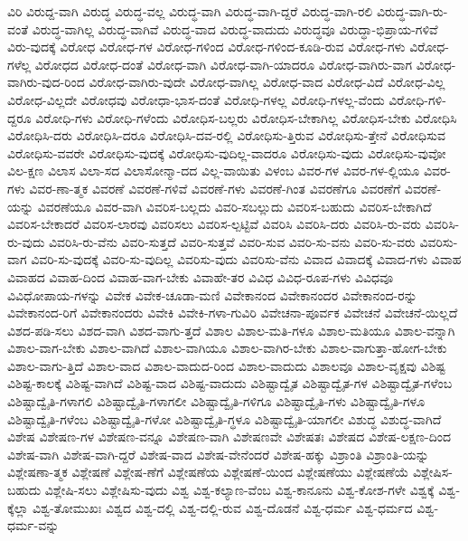 {ವಿರಿ
ವಿರುದ್ದ-ವಾಗಿ
ವಿರುದ್ಧ
ವಿರುದ್ಧ-ವಲ್ಲ
ವಿರುದ್ಧ-ವಾಗಿ
ವಿರುದ್ಧ-ವಾಗಿ-ದ್ದರೆ
ವಿರುದ್ಧ-ವಾಗಿ-ರಲಿ
ವಿರುದ್ಧ-ವಾಗಿ-ರು-ವಂತೆ
ವಿರುದ್ಧ-ವಾಗಿಲ್ಲ
ವಿರುದ್ಧ-ವಾಗಿವೆ
ವಿರುದ್ಧ-ವಾದ
ವಿರುದ್ಧ-ವಾದುದು
ವಿರುದ್ಧವೂ
ವಿರುದ್ಧಾ-ಭಿಪ್ರಾಯ-ಗಳಿವೆ
ವಿರು-ವುದಕ್ಕೆ
ವಿರೋಧ
ವಿರೋಧ-ಗಳ
ವಿರೋಧ-ಗಳಿಂದ
ವಿರೋಧ-ಗಳಿಂದ-ಕೂಡಿ-ರುವ
ವಿರೋಧ-ಗಳು
ವಿರೋಧ-ಗಳೆಲ್ಲ
ವಿರೋಧದ
ವಿರೋಧ-ದಂತೆ
ವಿರೋಧ-ವಾಗಿ
ವಿರೋಧ-ವಾಗಿ-ಯಾದರೂ
ವಿರೋಧ-ವಾಗಿರು-ವಾಗ
ವಿರೋಧ-ವಾಗಿರು-ವುದ-ರಿಂದ
ವಿರೋಧ-ವಾಗಿರು-ವುದೇ
ವಿರೋಧ-ವಾಗಿಲ್ಲ
ವಿರೋಧ-ವಾದ
ವಿರೋಧ-ವಿದೆ
ವಿರೋಧ-ವಿಲ್ಲ
ವಿರೋಧ-ವಿಲ್ಲದೇ
ವಿರೋಧವು
ವಿರೋಧಾ-ಭಾಸ-ದಂತೆ
ವಿರೋಧಿ-ಗಳಲ್ಲ
ವಿರೋಧಿ-ಗಳಲ್ಲ-ವೆಂದು
ವಿರೋಧಿ-ಗಳಿ-ದ್ದರೂ
ವಿರೋಧಿ-ಗಳು
ವಿರೋಧಿ-ಗಳೆಂದು
ವಿರೋಧಿಸ-ಬಲ್ಲರು
ವಿರೋಧಿಸ-ಬೇಕಾಗಿಲ್ಲ
ವಿರೋಧಿಸ-ಬೇಕು
ವಿರೋಧಿಸಿ
ವಿರೋಧಿಸಿ-ದರು
ವಿರೋಧಿಸಿ-ದರೂ
ವಿರೋಧಿಸಿ-ದವ-ರಲ್ಲಿ
ವಿರೋಧಿಸು-ತ್ತಿರುವ
ವಿರೋಧಿಸು-ತ್ತೇನೆ
ವಿರೋಧಿಸುವ
ವಿರೋಧಿಸು-ವವರೇ
ವಿರೋಧಿಸು-ವುದಕ್ಕೆ
ವಿರೋಧಿಸು-ವುದಿಲ್ಲ-ವಾದರೂ
ವಿರೋಧಿಸು-ವುದು
ವಿರೋಧಿಸು-ವುವೋ
ವಿಲ-ಕ್ಷಣ
ವಿಲಾಸ
ವಿಲಾ-ಸದ
ವಿಲಾಸೋನ್ಮಾ-ದದ
ವಿಲ್ಲ-ವಾಯಿತು
ವಿಳಂಬ
ವಿವರ-ಗಳ
ವಿವರ-ಗಳ-ಲ್ಲಿಯೂ
ವಿವರ-ಗಳು
ವಿವರ-ಣಾ-ತ್ಮಕ
ವಿವರಣೆ
ವಿವರಣೆ-ಗಳಿವೆ
ವಿವರಣೆ-ಗಳು
ವಿವರಣೆ-ಗಿಂತ
ವಿವರಣೆಗೂ
ವಿವರಣೆಗೆ
ವಿವರಣೆ-ಯನ್ನು
ವಿವರಣೆಯೂ
ವಿವರ-ವಾಗಿ
ವಿವರಿಸ-ಬಲ್ಲದು
ವಿವರಿ-ಸಬಲ್ಲುದು
ವಿವರಿಸ-ಬಹುದು
ವಿವರಿಸ-ಬೇಕಾಗಿದೆ
ವಿವರಿಸ-ಬೇಕಾದರೆ
ವಿವರಿಸ-ಲಾರವು
ವಿವರಿಸಲು
ವಿವರಿಸ-ಲ್ಪಟ್ಟಿವೆ
ವಿವರಿಸಿ
ವಿವರಿಸಿ-ದರು
ವಿವರಿಸಿ-ರು-ವರು
ವಿವರಿಸಿ-ರು-ವುದು
ವಿವರಿಸಿ-ರು-ವೆನು
ವಿವರಿ-ಸುತ್ತದೆ
ವಿವರಿ-ಸುತ್ತವೆ
ವಿವರಿ-ಸುವ
ವಿವರಿ-ಸು-ವನು
ವಿವರಿ-ಸು-ವರು
ವಿವರಿಸು-ವಾಗ
ವಿವರಿ-ಸು-ವುದಕ್ಕೆ
ವಿವರಿ-ಸು-ವುದಿಲ್ಲ
ವಿವರಿಸು-ವುದು
ವಿವರಿಸು-ವೆನು
ವಿವಾದ
ವಿವಾದಕ್ಕೆ
ವಿವಾದ-ಗಳು
ವಿವಾಹ
ವಿವಾಹದ
ವಿವಾಹ-ದಿಂದ
ವಿವಾಹ-ವಾಗ-ಬೇಕು
ವಿವಾಹೇ-ತರ
ವಿವಿಧ
ವಿವಿಧ-ರೂಪ-ಗಳು
ವಿವಿಧವೂ
ವಿವಿಧೋಪಾಯ-ಗಳನ್ನು
ವಿವೇಕ
ವಿವೇಕ-ಚೂಡಾ-ಮಣಿ
ವಿವೇಕಾನಂದ
ವಿವೇಕಾನಂದರ
ವಿವೇಕಾನಂದ-ರನ್ನು
ವಿವೇಕಾನಂದ-ರಿಗೆ
ವಿವೇಕಾನಂದರು
ವಿವೇಕಿ
ವಿವೇಕಿ-ಗಳಾ-ಗುವಿರಿ
ವಿವೇಚನಾ-ಪೂರ್ವಕ
ವಿವೇಚನೆ
ವಿವೇಚನೆ-ಯಿಲ್ಲದೆ
ವಿಶದ-ಪಡಿ-ಸಲು
ವಿಶದ-ವಾಗಿ
ವಿಶದ-ವಾಗು-ತ್ತದೆ
ವಿಶಾಲ
ವಿಶಾಲ-ಮತಿ-ಗಳೂ
ವಿಶಾಲ-ಮತಿಯೂ
ವಿಶಾಲ-ವನ್ನಾಗಿ
ವಿಶಾಲ-ವಾಗ-ಬೇಕು
ವಿಶಾಲ-ವಾಗಿದೆ
ವಿಶಾಲ-ವಾಗಿಯೂ
ವಿಶಾಲ-ವಾಗಿರ-ಬೇಕು
ವಿಶಾಲ-ವಾಗುತ್ತಾ-ಹೋಗ-ಬೇಕು
ವಿಶಾಲ-ವಾಗು-ತ್ತಿದೆ
ವಿಶಾಲ-ವಾದ
ವಿಶಾಲ-ವಾದುದ-ರಿಂದ
ವಿಶಾಲ-ವಾದುದು
ವಿಶಾಲವೂ
ವಿಶಾಲ-ವೃಕ್ಷವು
ವಿಶಿಷ್ಟ
ವಿಶಿಷ್ಟ-ಕಾಲಕ್ಕೆ
ವಿಶಿಷ್ಟ-ವಾಗಿದೆ
ವಿಶಿಷ್ಟ-ವಾದ
ವಿಶಿಷ್ಟ-ವಾದುದು
ವಿಶಿಷ್ಟಾದ್ವೈತ
ವಿಶಿಷ್ಟಾದ್ವೈತ-ಗಳ
ವಿಶಿಷ್ಟಾದ್ವೈತ-ಗಳೆಂಬ
ವಿಶಿಷ್ಟಾದ್ವೈತಿ-ಗಳಾಗಲಿ
ವಿಶಿಷ್ಟಾದ್ವೈತಿ-ಗಳಾಗಲೀ
ವಿಶಿಷ್ಟಾದ್ವೈತಿ-ಗಳಿಗೂ
ವಿಶಿಷ್ಟಾದ್ವೈತಿ-ಗಳು
ವಿಶಿಷ್ಟಾದ್ವೈತಿ-ಗಳೂ
ವಿಶಿಷ್ಟಾದ್ವೈತಿ-ಗಳೆಂಬ
ವಿಶಿಷ್ಟಾದ್ವೈತಿ-ಗಳೋ
ವಿಶಿಷ್ಟಾದ್ವೈತಿ-ಗ್ಧಳೂ
ವಿಶಿಷ್ಟಾದ್ವೈತಿ-ಯಾಗಲೀ
ವಿಶುದ್ಧ
ವಿಶುದ್ಧ-ವಾಗಿದೆ
ವಿಶೇಷ
ವಿಶೇಷಣ-ಗಳ
ವಿಶೇಷಣ-ವನ್ನೂ
ವಿಶೇಷಣ-ವಾಗಿ
ವಿಶೇಷಣವೇ
ವಿಶೇಷತಃ
ವಿಶೇಷದ
ವಿಶೇಷ-ಲಕ್ಷಣ-ದಿಂದ
ವಿಶೇಷ-ವಾಗಿ
ವಿಶೇಷ-ವಾಗಿ-ದ್ದರೆ
ವಿಶೇಷ-ವಾದ
ವಿಶೇಷ-ವೇನೆಂದರೆ
ವಿಶೇಷ-ಹಕ್ಕು
ವಿಶ್ರಾಂತಿ
ವಿಶ್ರಾಂತಿ-ಯನ್ನು
ವಿಶ್ಲೇಷಣಾ-ತ್ಮಕ
ವಿಶ್ಲೇಷಣೆ
ವಿಶ್ಲೇಷ-ಣೆಗೆ
ವಿಶ್ಲೇಷಣೆಯ
ವಿಶ್ಲೇಷಣೆ-ಯಿಂದ
ವಿಶ್ಲೇಷಣೆಯು
ವಿಶ್ಲೇಷಣೆಯೆ
ವಿಶ್ಲೇಷಿಸ-ಬಹುದು
ವಿಶ್ಲೇಷಿ-ಸಲು
ವಿಶ್ಲೇಷಿಸು-ವುದು
ವಿಶ್ವ
ವಿಶ್ವ-ಕಲ್ಯಾಣ-ವೆಂಬ
ವಿಶ್ವ-ಕಾನೂನು
ವಿಶ್ವ-ಕೋಶ-ಗಳೇ
ವಿಶ್ವಕ್ಕೆ
ವಿಶ್ವ-ಕ್ಕೆಲ್ಲಾ
ವಿಶ್ವ-ತೋಮುಖಃ
ವಿಶ್ವದ
ವಿಶ್ವ-ದಲ್ಲಿ
ವಿಶ್ವ-ದಲ್ಲಿ-ರುವ
ವಿಶ್ವ-ದೊಡನೆ
ವಿಶ್ವ-ಧರ್ಮ
ವಿಶ್ವ-ಧರ್ಮದ
ವಿಶ್ವ-ಧರ್ಮ-ವನ್ನು
}
